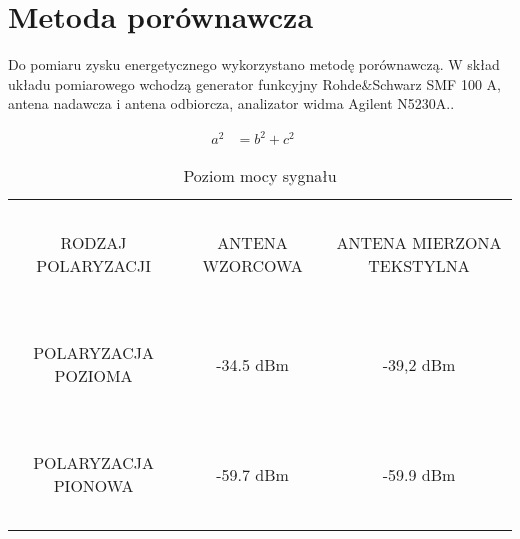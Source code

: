 \section{Metoda porównawcza}
Do pomiaru zysku energetycznego wykorzystano metodę porównawczą. W skład układu pomiarowego wchodzą generator funkcyjny Rohde&Schwarz SMF 100 A, antena nadawcza i antena odbiorcza, analizator widma Agilent N5230A..


\begin{align}
a^2&=b^2+c^2
\quad
\end{align}
 
\begin{table}[h!]
\begin{center}
    \begin{tabular}{|c|c|c|}
    \hline
    ~                     & ~               & ~                         \\
     RODZAJ POLARYZACJI    & ANTENA WZORCOWA & ANTENA MIERZONA TEKSTYLNA \\
    ~                     & ~               & ~                         \\ \hline
    ~                     & ~               & ~                         \\
     POLARYZACJA POZIOMA  & -34.5 dBm       & -39,2 dBm                 \\
    ~                     & ~               & ~                         \\ \hline
    ~                     & ~               & ~                         \\
     POLARYZACJA PIONOWA  & -59.7 dBm       & -59.9 dBm                 \\
    ~                     & ~               & ~                         \\ \hline
    \end{tabular}
    \caption{Poziom mocy sygnału}
\end{center}
\end{table}


